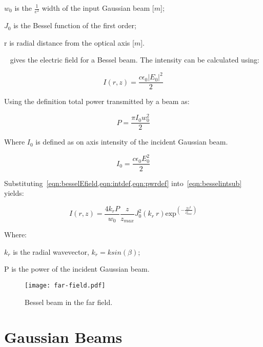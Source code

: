     \indent $w_0$ is the $\tfrac{1}{e^2}$ width of the input Gaussian beam [$m$]; 

    \indent $J_0$ is the Bessel function of the first order; 

    \indent r is radial distance from the optical axis [$m$]. 

\medskip


~ gives the electric field for a Bessel beam. The intensity can be calculated using:

\begin{equation}
    I(r,z)=\frac{c\epsilon_0\left|E_0\right|^2}{2}
    \label{eqn:besselintsub}
\end{equation}

Using the definition total power transmitted by a beam as:

\begin{equation}
    P=\frac{\pi I_0w_0^2}{2}
    \label{eqn:pwrdef}
\end{equation}

Where $I_0$ is defined as on axis intensity of the incident Gaussian beam.

\begin{equation}
    I_0=\frac{c\epsilon_0E_0^2}{2}
    \label{eqn:intdef}
\end{equation}

Substituting~\cref{eqn:besselEfield,eqn:intdef,eqn:pwrdef} into~\cref{eqn:besselintsub} yields:

\begin{equation}
    I(r,z)=\frac{4k_rP}{w_0}\frac{z}{z_{max}}J_0^2\left(k_r\ r\right)\text{exp}^{\left(-\frac{2z^2}{z^2_{max}}\right)}
\end{equation}


\noindent Where:

    \indent $k_r$ is the radial wavevector, $k_r=k sin(\beta)$;

    \indent P is the power of the incident Gaussian beam.



\begin{figure}
\centering
\texttt{[image: far-field.pdf]}
\caption{Bessel beam in the far field.}
\label{fig:farfield}
\end{figure}
\section{Gaussian Beams}




